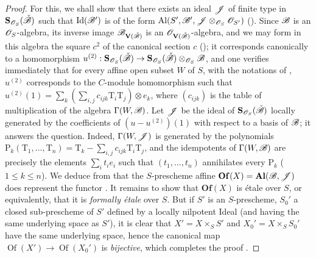 \begin{proof}
For this, we shall show that there exists an ideal $\mathscr{J}$ of finite type in $\mathbf{S}_{\mathscr{O}_S}(\check{\mathscr{B}})$ such that $\operatorname{Id}(\mathscr{B}')$ is of the form $\mathrm{Al}(S',\mathscr{B}',\mathscr{J}\otimes_{\mathscr{O}_S}\mathscr{O}_{S'})$ ().
Since $\mathscr{B}$ is an $\mathscr{O}_S$-algebra, its inverse image $\mathscr{B}_{\mathbf{V}(\check{\mathscr{B}})}$ is an $\mathscr{O}_{\mathbf{V}(\check{\mathscr{B}})}$-algebra, and we may form in this algebra the square $c^2$ of the canonical section $c$ ();
it corresponds canonically to a homomorphism $u^{(2)}:\mathbf{S}_{\mathscr{O}_S}(\check{\mathscr{B}})\to\mathbf{S}_{\mathscr{O}_S}(\check{\mathscr{B}})\otimes_{\mathscr{O}_S}\mathscr{B}$, and one verifies immediately that for every affine open subset $W$ of $S$, with the notations of , $u^{(2)}$ corresponds to the $C$-module homomorphism such that $u^{(2)}(1)=\sum_k(\sum_{i,j}c_{ijk}\mathrm{T}_i\mathrm{T}_j)\otimes e_k$, where $(c_{ijk})$ is the table of multiplication of the algebra $\Gamma(W,\mathscr{B})$.
Let $\mathscr{J}$ be the ideal of $\mathbf{S}_{\mathscr{O}_S}(\check{\mathscr{B}})$ locally generated by the coefficients of $(u-u^{(2)})(1)$ with respect to a basis of $\mathscr{B}$; it answers the question.
Indeed, $\Gamma(W,\mathscr{J})$ is generated by the polynomials $\mathrm{P}_k(\mathrm{T}_1,\ldots,\mathrm{T}_n)=\mathrm{T}_k-\sum_{i,j}c_{ijk}\mathrm{T}_i\mathrm{T}_j$, and the idempotents of $\Gamma(W,\mathscr{B})$ are precisely the elements $\sum_i t_i e_i$ such that $(t_1,\ldots,t_n)$ annihilates every $\mathrm{P}_k$ ($1\leq k\leq n$).
We deduce from  that the $S$-prescheme affine $\mathbf{Of}(X)=\mathbf{Al}(\mathscr{B},\mathscr{J})$ does represent the functor .
It remains to show that $\mathbf{Of}(X)$ is \'etale over $S$, or equivalently, that it is \emph{formally \'etale} over $S$.
But if $S'$ is an $S$-prescheme, $S_0'$ a closed sub-prescheme of $S'$ defined by a locally nilpotent Ideal (and having the same underlying space as $S'$), it is clear that $X'=X\times_S S'$ and $X_0'=X\times_S S_0'$ have the same underlying space, hence the canonical map $\operatorname{Of}(X')\to\operatorname{Of}(X_0')$ is \emph{bijective}, which completes the proof .
\end{proof}

